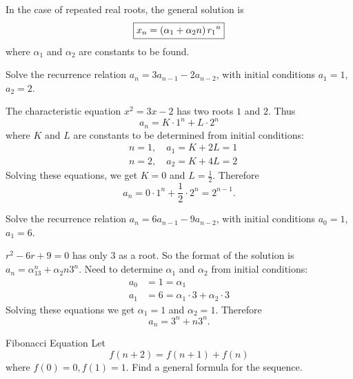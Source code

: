 In the case of repeated real roots, the general solution is
\[ \boxed{x_n=\left(\alpha_1+\alpha_2n\right){r_1}^n} \]
where $\alpha_1$ and $\alpha_2$ are constants to be found.

\begin{exercise}
Solve the recurrence relation $a_n=3a_{n-1}-2a_{n-2}$, with initial conditions $a_1=1$, $a_2=2$.
\end{exercise}

\begin{solution}
The characteristic equation $x^2=3x-2$ has two roots $1$ and $2$. Thus
\[ a_n=K\cdot1^n+L\cdot2^n \]
where $K$ and $L$ are constants to be determined from initial conditions:
\begin{align*}
&n=1,\quad a_1=K+2L=1\\
&n=2,\quad a_2=K+4L=2
\end{align*}
Solving these equations, we get $K=0$ and $L=\frac{1}{2}$. Therefore
\[ a_n=0\cdot1^n+\frac{1}{2}\cdot2^n=2^{n-1}. \]
\end{solution}

\begin{exercise}
Solve the recurrence relation $a_n=6a_{n-1}-9a_{n-2}$, with initial conditions $a_0=1$, $a_1=6$.
\end{exercise}

\begin{solution}
$r^2-6r+9=0$ has only $3$ as a root. So the format of the solution is $a_n=\alpha_13^n+\alpha_2n3^n$. Need to determine $\alpha_1$ and $\alpha_2$ from initial conditions:
\begin{align*}
a_0&=1=\alpha_1\\
a_1&=6=\alpha_1\cdot3+\alpha_2\cdot3
\end{align*}
Solving these equations we get $\alpha_1=1$ and $\alpha_2=1$. Therefore
\[ a_n=3^n+n3^n. \]
\end{solution}


\begin{exercise}{Fibonacci Equation}{} 
Let \[ f(n+2)=f(n+1)+f(n) \] 
where $f(0)=0, f(1)=1$. Find a general formula for the sequence.
\end{exercise} 

